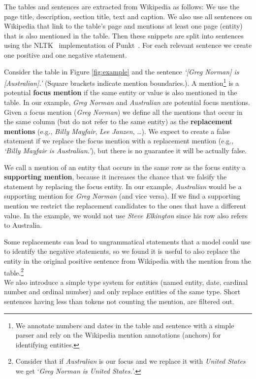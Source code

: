 \documentclass[11pt,a4paper]{article}
\theoremstyle{definition}
\begin{document}
The tables and sentences are extracted from Wikipedia as follows:
We use the page title, description, section title, text and caption. 
We also use all sentences on Wikipedia that link to the table's page and mentions at least one page (entity) that is also mentioned in the table.
Then these snippets are split into sentences using the NLTK~\cite{loper-02} implementation of Punkt~\cite{kiss-06}.
For each relevant sentence we create one positive and one negative statement.

Consider the table in Figure \ref{fig:example} and the sentence \emph{`[Greg Norman] is [Australian].'} (Square brackets indicate mention boundaries.).
A mention\footnote{We annotate numbers and dates in the table and sentence with a simple parser and rely on the Wikipedia mention annotations (anchors) for identifying entities.} is a potential \textbf{focus mention} if the same entity or value is also mentioned in the table. In our example, \emph{Greg Norman} and \emph{Australian} are potential focus mentions.
Given a focus mention (\emph{Greg Norman}) we define all the mentions that occur in the same column (but do not refer to the same entity) as the \textbf{replacement mentions} (e.g., \emph{Billy Mayfair}, \emph{Lee Janzen}, \dots). We expect to create a false statement if we replace the focus mention with a replacement mention (e.g., \emph{`Billy Mayfair is Australian.'}), but there is no guarantee it will be actually false.

We call a mention of an entity that occurs in the same row as the focus entity a \textbf{supporting mention}, because it increases the chance that we falsify the statement by replacing the focus entity. In our example, \emph{Australian} would be a supporting mention for \emph{Greg Norman} (and vice versa). If we find a supporting mention we restrict the replacement candidates to the ones that have a different value. In the example, we would not use \emph{Steve Elkington} since his row also refers to Australia.

Some replacements can lead to ungrammatical statements that a model could use to identify the negative statements,
so we found it is useful to also replace the entity in the original positive sentence from Wikipedia with the mention from the table.\footnote{
 Consider that if \emph{Australian} is our focus and we replace it with \emph{United States} we get `\emph{Greg Norman is United States.}'.} \\
We also introduce a simple type system for entities (named entity, date, cardinal number and ordinal number) and only replace entities of the same type.
Short sentences having less than  tokens not counting the mention, are filtered out.
\end{document}

